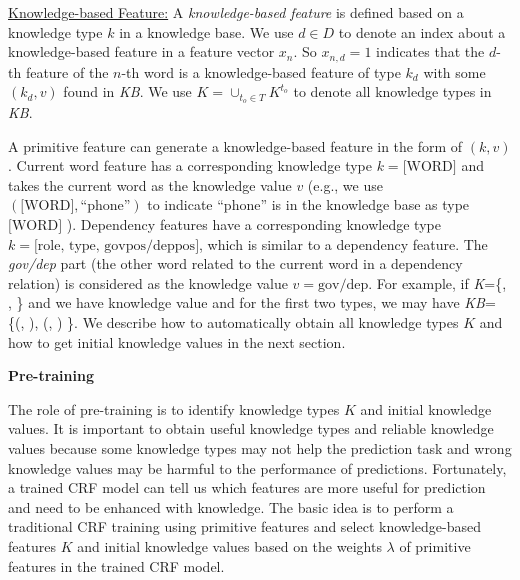 \underline{Knowledge-based Feature:} \label{chap6:defn:kbf} 
A \emph{knowledge-based feature} is defined based on a knowledge type $k$ in a knowledge base. We use $d \in D$ to denote an index about a knowledge-based feature in a feature vector $x_n$. So $x_{n,d}=1$ indicates that the $d$-th feature of the $n$-th word is a knowledge-based feature of type $k_d$ with some $(k_d, v)$ found in \textit{KB}. We use $K=\cup_{t_o \in T} K^{t_o}$ to denote all knowledge types in \textit{KB}. 

A primitive feature can generate a knowledge-based feature in the form of $(k, v)$. Current word feature has a corresponding knowledge type $k=\text{[WORD]}$ and takes the current word as the knowledge value $v$ (e.g., we use $(\text{[WORD]}, \text{``phone''})$ to indicate ``phone'' is in the knowledge base as type $\text{[WORD]}$ ). Dependency features have a corresponding knowledge type $k=\text{[role, type, govpos/deppos]}$, which is similar to a dependency feature. The \textit{gov/dep} part (the other word related to the current word in a dependency relation) is considered as the knowledge value $v=\text{gov/dep}$. For example, if \textit{K}=\{\text{[WORD]}, , \} and we have knowledge value  and  for the first two types, we may have \textit{KB}=\{(\text{[WORD]}, ), (, ) \}. We describe how to automatically obtain all knowledge types $K$ and how to get initial knowledge values in the next section.

\textbf{Pre-training}

The role of pre-training is to identify knowledge types $K$ and initial knowledge values. It is important to obtain useful knowledge types and reliable knowledge values because some knowledge types may not help the prediction task and wrong knowledge values may be harmful to the performance of predictions. Fortunately, a trained CRF model can tell us which features are more useful for prediction and need to be enhanced with knowledge. The basic idea is to perform a traditional CRF training using primitive features and select knowledge-based features $K$ and initial knowledge values based on the weights $\lambda$ of primitive features in the trained CRF model. 

